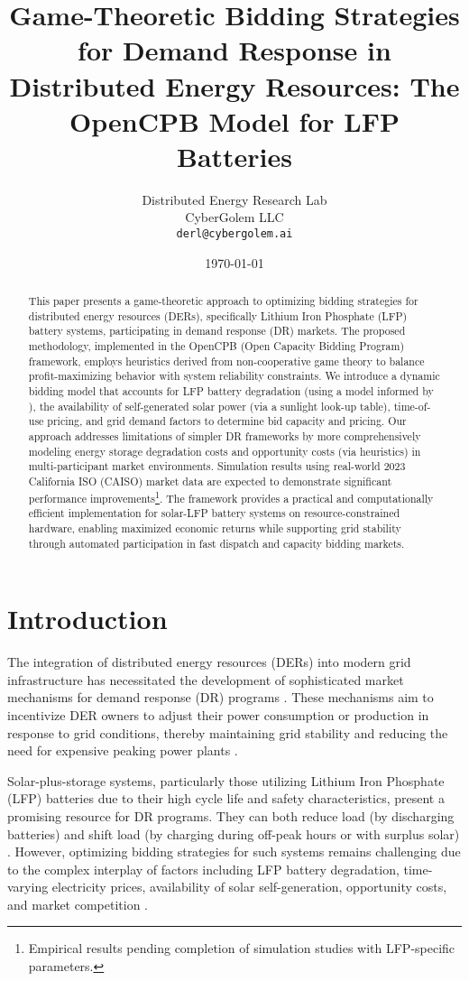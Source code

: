 \documentclass[11pt,a4paper]{article}
\title{Game-Theoretic Bidding Strategies for Demand Response in Distributed Energy Resources: The OpenCPB Model for LFP Batteries}
\author{Distributed Energy Research Lab\\
        CyberGolem LLC\\
        \texttt{derl@cybergolem.ai}}
\date{\today}
\begin{document}
\maketitle

\begin{abstract}
This paper presents a game-theoretic approach to optimizing bidding strategies for distributed energy resources (DERs), specifically Lithium Iron Phosphate (LFP) battery systems, participating in demand response (DR) markets. The proposed methodology, implemented in the OpenCPB (Open Capacity Bidding Program) framework, employs heuristics derived from non-cooperative game theory to balance profit-maximizing behavior with system reliability constraints. We introduce a dynamic bidding model that accounts for LFP battery degradation (using a model informed by \citet{Millner2010}), the availability of self-generated solar power (via a sunlight look-up table), time-of-use pricing, and grid demand factors to determine bid capacity and pricing. Our approach addresses limitations of simpler DR frameworks by more comprehensively modeling energy storage degradation costs and opportunity costs (via heuristics) in multi-participant market environments. Simulation results using real-world 2023 California ISO (CAISO) market data are expected to demonstrate significant performance improvements\footnote{Empirical results pending completion of simulation studies with LFP-specific parameters.}. The framework provides a practical and computationally efficient implementation for solar-LFP battery systems on resource-constrained hardware, enabling maximized economic returns while supporting grid stability through automated participation in fast dispatch and capacity bidding markets.
\end{abstract}

\section{Introduction}
The integration of distributed energy resources (DERs) into modern grid infrastructure has necessitated the development of sophisticated market mechanisms for demand response (DR) programs \citep{Siano2014}. These mechanisms aim to incentivize DER owners to adjust their power consumption or production in response to grid conditions, thereby maintaining grid stability and reducing the need for expensive peaking power plants \citep{Shariatzadeh2015}.

Solar-plus-storage systems, particularly those utilizing Lithium Iron Phosphate (LFP) batteries due to their high cycle life and safety characteristics, present a promising resource for DR programs. They can both reduce load (by discharging batteries) and shift load (by charging during off-peak hours or with surplus solar) \citep{Burger2017}. However, optimizing bidding strategies for such systems remains challenging due to the complex interplay of factors including LFP battery degradation, time-varying electricity prices, availability of solar self-generation, opportunity costs, and market competition \citep{He2016}.
\end{document}
